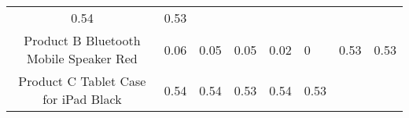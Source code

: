 \documentclass[]{article}
\begin{document}
\begin{longtable}[]{@{}ccllllll@{}}
\begin{minipage}[t]{0.05\columnwidth}
0.54\strut
\end{minipage} & \begin{minipage}[t]{0.05\columnwidth}\raggedright\strut
0.53\strut
\end{minipage}\tabularnewline
\begin{minipage}[t]{0.36\columnwidth}\centering\strut
Product B Bluetooth Mobile Speaker Red\strut
\end{minipage} & \begin{minipage}[t]{0.05\columnwidth}\centering\strut
0.06\strut
\end{minipage} & \begin{minipage}[t]{0.05\columnwidth}\raggedright\strut
0.05\strut
\end{minipage} & \begin{minipage}[t]{0.05\columnwidth}\raggedright\strut
0.05\strut
\end{minipage} & \begin{minipage}[t]{0.05\columnwidth}\raggedright\strut
0.02\strut
\end{minipage} & \begin{minipage}[t]{0.05\columnwidth}\raggedright\strut
0\strut
\end{minipage} & \begin{minipage}[t]{0.05\columnwidth}\raggedright\strut
0.53\strut
\end{minipage} & \begin{minipage}[t]{0.05\columnwidth}\raggedright\strut
0.53\strut
\end{minipage}\tabularnewline
\begin{minipage}[t]{0.36\columnwidth}\centering\strut
Product C Tablet Case for iPad Black\strut
\end{minipage} & \begin{minipage}[t]{0.05\columnwidth}\centering\strut
0.54\strut
\end{minipage} & \begin{minipage}[t]{0.05\columnwidth}\raggedright\strut
0.54\strut
\end{minipage} & \begin{minipage}[t]{0.05\columnwidth}\raggedright\strut
0.53\strut
\end{minipage} & \begin{minipage}[t]{0.05\columnwidth}\raggedright\strut
0.54\strut
\end{minipage} & \begin{minipage}[t]{0.05\columnwidth}\raggedright\strut
0.53\strut
\end{minipage} & \begin{minipage}[t]{0.05\columnwidth}\raggedright\strut

\end{minipage}
\end{longtable}
\end{document}
